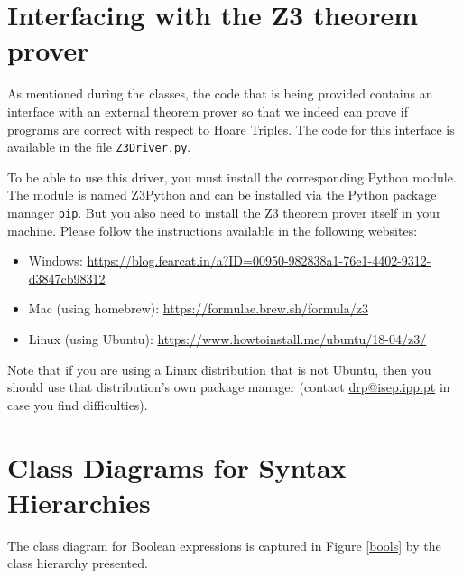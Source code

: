 \documentclass[11pt]{article}
\begin{document}
\section*{Interfacing with the Z3 theorem prover}  

As mentioned during the classes, the code that is being provided contains an interface with an external theorem prover so that we indeed can prove if programs are correct with respect to Hoare Triples. The code for this interface is available in the file \texttt{Z3Driver.py}.

To be able to use this driver, you must install the corresponding Python module. The module is named Z3Python and can be installed via the Python package manager \texttt{pip}. But you also need to install the Z3 theorem prover itself in your machine. Please follow the instructions available in the following websites:
\begin{itemize}
  \item Windows: \url{https://blog.fearcat.in/a?ID=00950-982838a1-76e1-4402-9312-d3847cb98312}
  \item Mac (using homebrew): \url{https://formulae.brew.sh/formula/z3}
  \item Linux (using Ubuntu): \url{https://www.howtoinstall.me/ubuntu/18-04/z3/} 
\end{itemize}

Note that if you are using a Linux distribution that is not Ubuntu, then you should use that distribution's own package manager (contact \url{drp@isep.ipp.pt} in case you find difficulties).



\section*{Class Diagrams for Syntax Hierarchies}

The class diagram for Boolean expressions is captured in Figure \ref{bools} by the class hierarchy presented.
\end{document}

